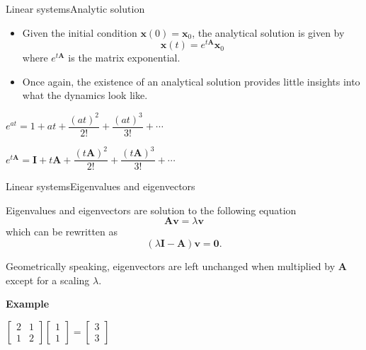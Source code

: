 \documentclass[usenames,dvipsnames,svgnames,10pt,aspectratio=169]{beamer}
\begin{document}
\begin{frame}[t, c]{Linear systems}{Analytic solution}
  \begin{minipage}{.58\textwidth}
    \begin{itemize}
      \item Given the initial condition $\bm{x}(0) = \bm{x}_0$, the analytical solution is given by
        \[
        \bm{x}(t) = e^{t \bm{A}} \bm{x}_0
        \]
        where $e^{t \bm{A}}$ is the matrix exponential.

        \bigskip

      \item Once again, the existence of an analytical solution provides little insights into what the dynamics look like.
    \end{itemize}
  \end{minipage}%
  \hfill
  \begin{minipage}{.38\textwidth}
    \centering
    \( e^{at} = 1 + at + \dfrac{(at)^2}{2!} + \dfrac{(at)^3}{3!} + \cdots \)

    \bigskip

    \( e^{t\bm{A}} = \bm{I} + t \bm{A} + \dfrac{(t \bm{A})^2}{2!} + \dfrac{(t \bm{A})^3}{3!} + \cdots \)
  \end{minipage}

  \vspace{1cm}
\end{frame}

\begin{frame}[t, c]{Linear systems}{Eigenvalues and eigenvectors}
  \begin{minipage}{.68\textwidth}
    Eigenvalues and eigenvectors are solution to the following equation
    \[
    \bm{Av} = \lambda \bm{v}
    \]
    which can be rewritten as
    \[
    \left( \lambda \bm{I} - \bm{A} \right) \bm{v} = \bm{0}.
    \]
    
    Geometrically speaking, eigenvectors are left unchanged when multiplied by $\bm{A}$ except for a scaling $\lambda$.
  \end{minipage}%
  \hfill
  \begin{minipage}{.28\textwidth}
    \centering
    \textbf{Example}

    \bigskip

    \(
    \begin{bmatrix}
      2 & 1 \\ 1 & 2
    \end{bmatrix}
    \begin{bmatrix}
      1 \\ 1
    \end{bmatrix}
    =
    \begin{bmatrix}
      3 \\ 3
    \end{bmatrix}
    \)
  \end{minipage}

  \vspace{1cm}
\end{frame}
\end{document}
